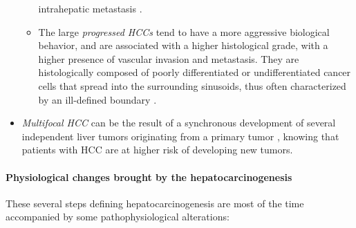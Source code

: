 \begin{itemize}
\begin{itemize}
    intrahepatic metastasis \cite{Park2011}.
  \item The large \emph{progressed HCCs} tend to have a more aggressive
    biological behavior, and are associated with a higher histological
    grade, with a higher presence of vascular invasion and metastasis. They are histologically composed of poorly differentiated or
    undifferentiated cancer cells that spread into the surrounding
    sinusoids, thus often characterized by an ill-defined boundary \cite{Kudo2010,Beasley1981,ElSerag2011,Baffy2012,McGlynn2011,Tyson2011, Theise2006, Trevisani2008a}.
  \end{itemize}
\item \emph{Multifocal HCC} can be the result of a synchronous development
  of several independent liver tumors originating from a primary tumor \cite{Trevisani2008a}, knowing that patients with
  HCC are at higher risk of developing new tumors.
\end{itemize}

\paragraph{Physiological changes brought by the hepatocarcinogenesis}

These several steps defining hepatocarcinogenesis are most of the time
accompanied by some pathophysiological alterations:


